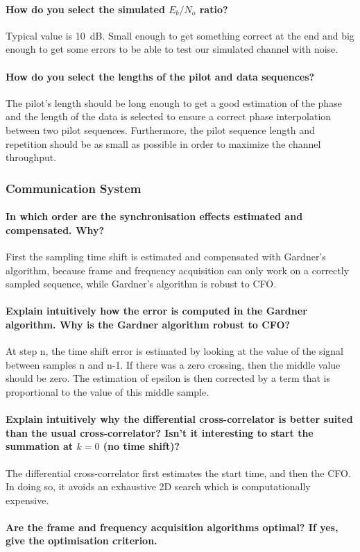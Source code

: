 \paragraph{How do you select the simulated $E_{b}/N_{o}$ ratio?} Typical value is \SI{10}{\deci\bel}. Small enough to get something correct at the end and big enough to get some errors to be able to test our simulated channel with noise.

\paragraph{How do you select the lengths of the pilot and data sequences?} The pilot's length should be long enough to get a good estimation of the phase and the length of the data is selected to ensure a correct phase interpolation between two pilot sequences. Furthermore, the pilot sequence length and repetition should be as small as possible in order to maximize the channel throughput.

\subsubsection{Communication System}


\paragraph{In which order are the synchronisation effects estimated and compensated. Why?} First the sampling time shift is estimated and compensated with Gardner's algorithm, because frame and frequency acquisition can only work on a correctly sampled sequence, while Gardner's algorithm is robust to CFO.


\paragraph{Explain intuitively how the error is computed in the Gardner algorithm. Why is the
Gardner algorithm robust to CFO?} At step n, the time shift error is estimated by looking at the value of the signal between samples n and n-1. If there was a zero crossing, then the middle value should be zero. The estimation of epsilon is then corrected by a term that is proportional to the value of this middle sample.

\paragraph{Explain intuitively why the differential cross-correlator is better suited than the usual cross-correlator? Isn’t it interesting to start the summation at $k = 0$ (no time shift)?}
The differential cross-correlator first estimates the start time, and then the CFO. In doing so, it avoids an exhaustive 2D search which is computationally expensive.

\paragraph{Are the frame and frequency acquisition algorithms optimal? If yes, give the optimisation criterion.}
